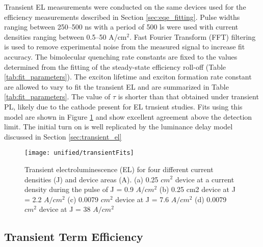 \documentclass[../thesis.tex]{subfiles}
\begin{document}
Transient EL measurements were conducted on the same devices used for the efficiency measurements described in Section \ref{sec:eqe_fitting}. 
Pulse widths ranging between 250–500 ns with a period of 500 ls were used with current densities ranging between 0.5–50 A/cm$^2$. 
Fast Fourier Transform (FFT) filtering is used to remove experimental noise from the measured signal to increase fit accuracy. 
The bimolecular quenching rate constants are fixed to the values determined from the fitting of the steady-state efficiency roll-off (Table \ref{tab:fit_parameters}).
The exciton lifetime and exciton formation rate constant are allowed to vary to fit the transient EL and are summarized in Table \ref{tab:fit_parameters}.
The value of $\tau$ is shorter than that obtained under transient PL, likely due to the cathode present for EL trnsient studies.\cite{Song2011}
Fits using this model are shown in Figure \ref{fig:transientFits} and show excellent agreement above the detection limit.  The initial turn on is well replicated by the luminance delay model discussed in Section \ref{sec:transient_el}


\begin{figure}[ht]
\centering
\texttt{[image: unified/transientFits]}
\caption{Transient electroluminescence (EL) for four different current densities (J) and device areas (A). (a) 0.25 $cm^2$ device at a current density during the pulse of J = 0.9 $A/cm^2$ (b) 0.25 cm2
device at J = 2.2 $A/cm^2$ (c) 0.0079 $cm^2$ device at J = 7.6 $A/cm^2$ (d) 0.0079 $cm^2$ device at J = 38 $A/cm^2$}
\label{fig:transientFits}
\end{figure}


\subsection{Transient Term Efficiency}
\end{document}

